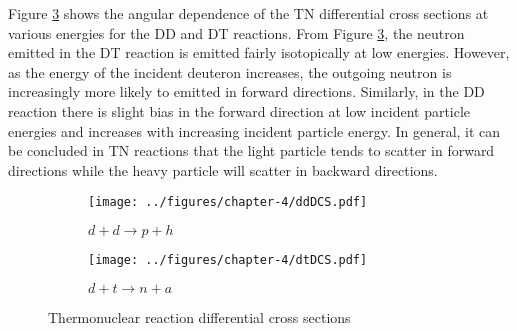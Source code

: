 Figure \ref{fig:tnDiffernetialCrossSections} shows the angular dependence of the TN differential cross sections at various energies for the DD and DT reactions. From Figure \ref{fig:tnDiffernetialCrossSections}, the neutron emitted in the DT reaction is emitted fairly isotopically at low energies. However, as the energy of the incident deuteron increases, the outgoing neutron is increasingly more likely to emitted in forward directions. Similarly, in the DD reaction there is slight bias in the forward direction at low incident particle energies and increases with increasing incident particle energy. In general, it can be concluded in TN reactions that the light particle tends to scatter in forward directions while the heavy particle will scatter in backward directions.

\begin{figure}[!htb]
  \centering
  \begin{subfigure}{.45\textwidth}
    \centering
    \texttt{[image: ../figures/chapter-4/ddDCS.pdf]}
    \caption{$d + d \rightarrow p + h$}
    \label{fig:ddDCS}
  \end{subfigure}%
  \begin{subfigure}{.45\textwidth}
    \centering
    \texttt{[image: ../figures/chapter-4/dtDCS.pdf]}
    \caption{$d + t \rightarrow n + a$}
    \label{fig:dtDCS}
  \end{subfigure}
  \caption{Thermonuclear reaction differential cross sections}
  \label{fig:tnDiffernetialCrossSections}
\end{figure}